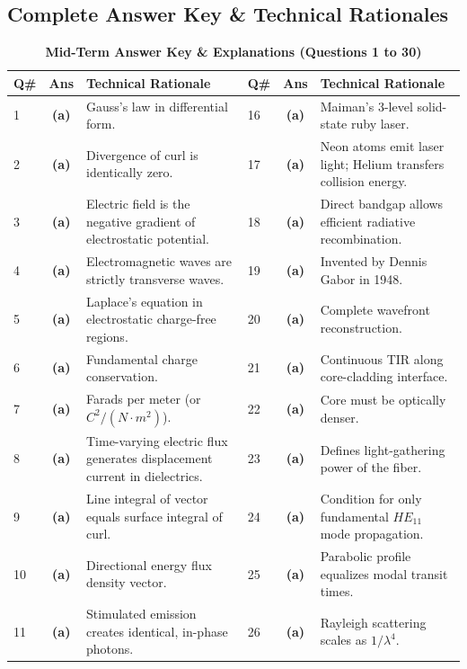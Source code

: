\newpage
\subsection*{Complete Answer Key \& Technical Rationales}

\begin{table}[htbp]
\centering
\caption{\textbf{Mid-Term Answer Key \& Explanations (Questions 1 to 30)}}
\vspace{2mm}
\begin{tabularx}{\textwidth}{l c X l c X}
\toprule
\textbf{Q\#} & \textbf{Ans} & \textbf{Technical Rationale} & \textbf{Q\#} & \textbf{Ans} & \textbf{Technical Rationale} \\
\midrule
1 & \textbf{(a)} & Gauss's law in differential form. & 16 & \textbf{(a)} & Maiman's 3-level solid-state ruby laser. \\
2 & \textbf{(a)} & Divergence of curl is identically zero. & 17 & \textbf{(a)} & Neon atoms emit laser light; Helium transfers collision energy. \\
3 & \textbf{(a)} & Electric field is the negative gradient of electrostatic potential. & 18 & \textbf{(a)} & Direct bandgap allows efficient radiative recombination. \\
4 & \textbf{(a)} & Electromagnetic waves are strictly transverse waves. & 19 & \textbf{(a)} & Invented by Dennis Gabor in 1948. \\
5 & \textbf{(a)} & Laplace's equation in electrostatic charge-free regions. & 20 & \textbf{(a)} & Complete wavefront reconstruction. \\
6 & \textbf{(a)} & Fundamental charge conservation. & 21 & \textbf{(a)} & Continuous TIR along core-cladding interface. \\
7 & \textbf{(a)} & Farads per meter (or $C^2/(N\cdot m^2)$). & 22 & \textbf{(a)} & Core must be optically denser. \\
8 & \textbf{(a)} & Time-varying electric flux generates displacement current in dielectrics. & 23 & \textbf{(a)} & Defines light-gathering power of the fiber. \\
9 & \textbf{(a)} & Line integral of vector equals surface integral of curl. & 24 & \textbf{(a)} & Condition for only fundamental $HE_{11}$ mode propagation. \\
10 & \textbf{(a)} & Directional energy flux density vector. & 25 & \textbf{(a)} & Parabolic profile equalizes modal transit times. \\
11 & \textbf{(a)} & Stimulated emission creates identical, in-phase photons. & 26 & \textbf{(a)} & Rayleigh scattering scales as $1/\lambda^4$. \\

\end{tabularx}
\end{table}
